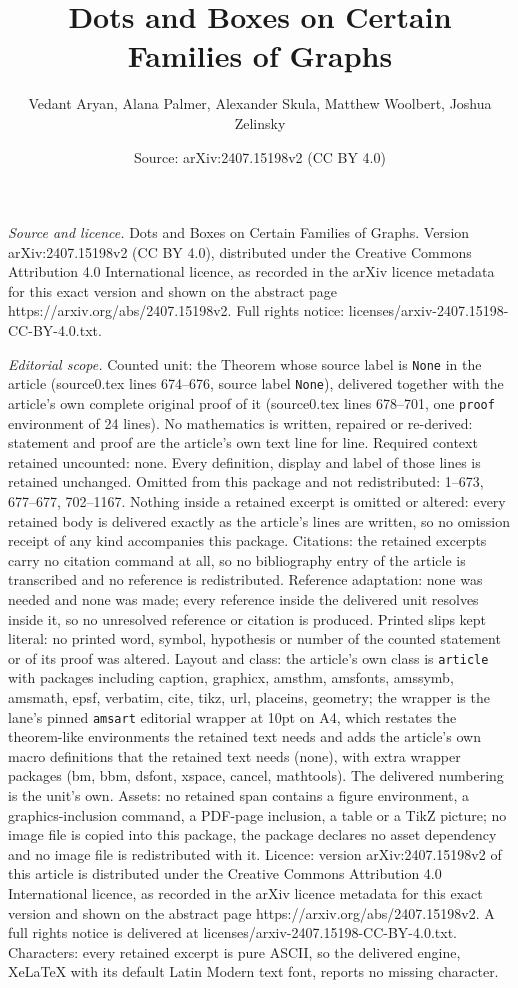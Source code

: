 \documentclass[10pt,a4paper]{amsart}
\title[Dots and Boxes on Certain Families of Graphs]{Dots and Boxes on Certain Families of Graphs}
\author{Vedant Aryan, Alana Palmer, Alexander Skula, Matthew Woolbert, Joshua Zelinsky}
\date{Source: arXiv:2407.15198v2 (CC BY 4.0)}
\begin{document}
\maketitle

\noindent\emph{Source and licence.} Dots and Boxes on Certain Families of Graphs. Version arXiv:2407.15198v2 (CC BY 4.0), distributed under the Creative Commons Attribution 4.0 International licence, as recorded in the arXiv licence metadata for this exact version and shown on the abstract page https://arxiv.org/abs/2407.15198v2. Full rights notice: licenses/arxiv-2407.15198-CC-BY-4.0.txt.\par\smallskip

\noindent\textit{Editorial scope.} Counted unit: the Theorem whose source label is \texttt{None} in the article (source0.tex lines 674--676, source label \texttt{None}), delivered together with the article's own complete original proof of it (source0.tex lines 678--701, one \texttt{proof} environment of 24 lines). No mathematics is written, repaired or re-derived: statement and proof are the article's own text line for line. Required context retained uncounted: none. Every definition, display and label of those lines is retained unchanged. Omitted from this package and not redistributed: 1--673, 677--677, 702--1167. Nothing inside a retained excerpt is omitted or altered: every retained body is delivered exactly as the article's lines are written, so no omission receipt of any kind accompanies this package. Citations: the retained excerpts carry no citation command at all, so no bibliography entry of the article is transcribed and no reference is redistributed. Reference adaptation: none was needed and none was made; every reference inside the delivered unit resolves inside it, so no unresolved reference or citation is produced. Printed slips kept literal: no printed word, symbol, hypothesis or number of the counted statement or of its proof was altered. Layout and class: the article's own class is \texttt{article} with packages including caption, graphicx, amsthm, amsfonts, amssymb, amsmath, epsf, verbatim, cite, tikz, url, placeins, geometry; the wrapper is the lane's pinned \texttt{amsart} editorial wrapper at 10pt on A4, which restates the theorem-like environments the retained text needs and adds the article's own macro definitions that the retained text needs (none), with extra wrapper packages (bm, bbm, dsfont, xspace, cancel, mathtools). The delivered numbering is the unit's own. Assets: no retained span contains a figure environment, a graphics-inclusion command, a PDF-page inclusion, a table or a TikZ picture; no image file is copied into this package, the package declares no asset dependency and no image file is redistributed with it. Licence: version arXiv:2407.15198v2 of this article is distributed under the Creative Commons Attribution 4.0 International licence, as recorded in the arXiv licence metadata for this exact version and shown on the abstract page https://arxiv.org/abs/2407.15198v2. A full rights notice is delivered at licenses/arxiv-2407.15198-CC-BY-4.0.txt. Characters: every retained excerpt is pure ASCII, so the delivered engine, XeLaTeX with its default Latin Modern text font, reports no missing character.
\end{document}

